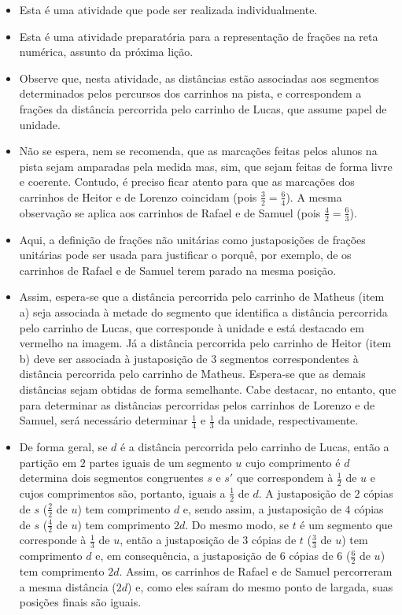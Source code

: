 \begin{orientacoes}
  \begin{itemize} %
    \item       Esta é uma atividade que pode ser realizada individualmente.
    \item       Esta é uma atividade preparatória para a representação de frações na reta numérica, assunto da próxima lição.
    \item       Observe que, nesta atividade, as distâncias estão associadas aos segmentos determinados pelos percursos dos carrinhos na pista, e correspondem a frações da distância percorrida pelo carrinho de Lucas, que assume papel de unidade.
    \item       Não se espera, nem se recomenda, que as marcações feitas pelos alunos na pista sejam amparadas pela medida mas, sim, que sejam feitas de forma livre e coerente. Contudo, é preciso ficar atento para que as marcações dos carrinhos de Heitor e de Lorenzo coincidam (pois       $\frac{3}{2} = \frac{6}{4}$). A mesma observação se aplica aos carrinhos de Rafael e de Samuel (pois       $\frac{4}{2} = \frac{6}{3}$).
    \item       Aqui, a definição de frações não unitárias como justaposições de frações unitárias pode ser usada para justificar o porquê, por exemplo, de os carrinhos de Rafael e de Samuel terem parado na mesma posição.
    \item       Assim, espera-se que a distância percorrida pelo carrinho de Matheus (item a) seja associada à metade do segmento que identifica a distância percorrida pelo carrinho de Lucas, que corresponde à unidade e está destacado em vermelho na imagem. Já a distância percorrida pelo carrinho de Heitor (item b) deve ser associada à justaposição de       $3$ segmentos correspondentes à distância percorrida pelo carrinho de Matheus. Espera-se que as demais distâncias sejam obtidas de forma semelhante. Cabe destacar, no entanto, que para determinar as distâncias percorridas pelos carrinhos de Lorenzo e de Samuel, será necessário determinar       $\frac{1}{4}$ e       $\frac{1}{3}$ da unidade, respectivamente.
    \item       De forma geral, se       $d$ é a distância percorrida pelo carrinho de Lucas, então a partição em       $2$ partes iguais de um segmento       $u$ cujo comprimento é       $d$ determina dois segmentos congruentes $s$ e $s'$ que correspondem à       $\frac{1}{2}$ de       $u$ e cujos comprimentos são, portanto, iguais a       $\frac{1}{2}$ de       $d$. A justaposição de       $2$ cópias de       $s$ ($\frac{2}{2}$ de       $u$) tem comprimento       $d$ e, sendo assim, a justaposição de       $4$ cópias de       $s$ ($\frac{4}{2}$ de $u$) tem comprimento       $2d$. Do mesmo modo, se       $t$ é um segmento que corresponde à       $\frac{1}{3}$ de       $u$, então a justaposição de       $3$ cópias de       $t$ ($\frac{3}{3}$ de       $u$) tem comprimento       $d$ e, em consequência, a justaposição de       $6$ cópias de       $6$ ($\frac{6}{2}$ de       $u$) tem comprimento       $2d$. Assim, os carrinhos de Rafael e de Samuel percorreram a mesma distância ($2d$) e, como eles saíram do mesmo ponto de largada, suas posições finais são iguais.

\end{itemize}
\end{orientacoes}
